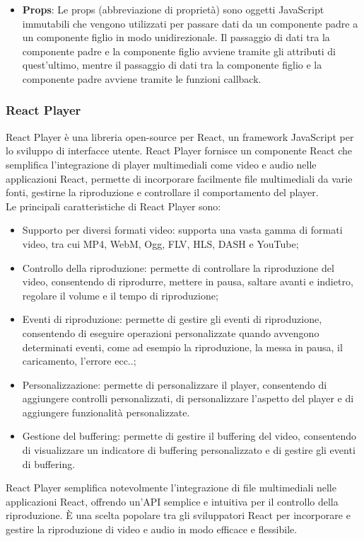 \begin{itemize}
\item \textbf{Props}:
Le props (abbreviazione di proprietà) sono oggetti JavaScript immutabili che vengono utilizzati per passare dati da un componente padre a un componente figlio in modo unidirezionale.
Il passaggio di dati tra la componente padre e la componente figlio avviene tramite gli attributi di quest'ultimo, mentre il passaggio di dati tra la componente figlio e la componente padre avviene tramite le funzioni callback.\\
    \end{itemize}
\subsubsection{React Player}
React Player è una libreria open-source per React, un framework JavaScript per lo sviluppo di interfacce utente. React Player fornisce un componente React che semplifica l'integrazione di player multimediali come video e audio nelle applicazioni React, permette di incorporare facilmente file multimediali da varie fonti, gestirne la riproduzione e controllare il comportamento del player.\\
Le principali caratteristiche di React Player sono:
\begin{itemize}
    \item{Supporto per diversi formati video}: supporta una vasta gamma di formati video, tra cui MP4, WebM, Ogg, FLV, HLS, DASH e YouTube;
    \item{Controllo della riproduzione}: permette di controllare la riproduzione del video, consentendo di riprodurre, mettere in pausa, saltare avanti e indietro, regolare il volume e il tempo di riproduzione;
    \item{Eventi di riproduzione}: permette di gestire gli eventi di riproduzione, consentendo di eseguire operazioni personalizzate quando avvengono determinati eventi, come ad esempio la riproduzione, la messa in pausa, il caricamento, l'errore ecc..;
    \item{Personalizzazione}: permette di personalizzare il player, consentendo di aggiungere controlli personalizzati, di personalizzare l'aspetto del player e di aggiungere funzionalità personalizzate.
    \item{Gestione del buffering}: permette di gestire il buffering del video, consentendo di visualizzare un indicatore di buffering personalizzato e di gestire gli eventi di buffering.
\end{itemize}
React Player semplifica notevolmente l'integrazione di file multimediali nelle applicazioni React, offrendo un'API semplice e intuitiva per il controllo della riproduzione. È una scelta popolare tra gli sviluppatori React per incorporare e gestire la riproduzione di video e audio in modo efficace e flessibile.\\
